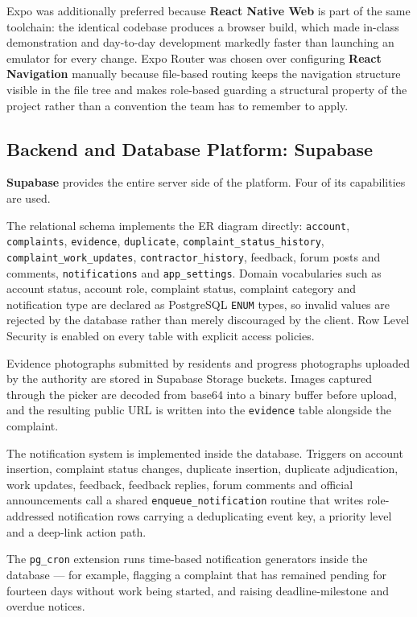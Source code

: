 \documentclass[11pt,a4paper]{article}
\newcommand{\code}[1]{\texttt{\small #1}}
\begin{document}
Expo was additionally preferred because \textbf{React Native Web} is part of the
same toolchain: the identical codebase produces a browser build, which made
in-class demonstration and day-to-day development markedly faster than launching
an emulator for every change. Expo Router was chosen over configuring
\textbf{React Navigation} manually because file-based routing keeps the
navigation structure visible in the file tree and makes role-based guarding a
structural property of the project rather than a convention the team has to
remember to apply.

\subsection{Backend and Database Platform: Supabase}

\textbf{Supabase} provides the entire server side of the platform. Four of its
capabilities are used.

\begin{description}[leftmargin=1.6em,style=nextline,itemsep=0.4em]
  \item[PostgreSQL database.] The relational schema implements the ER diagram
        directly: \code{account}, \code{complaints}, \code{evidence},
        \code{duplicate}, \code{complaint\_status\_history},
        \code{complaint\_work\_updates}, \code{contractor\_history}, feedback,
        forum posts and comments, \code{notifications} and \code{app\_settings}.
        Domain vocabularies such as account status, account role, complaint
        status, complaint category and notification type are declared as
        PostgreSQL \code{ENUM} types, so invalid values are rejected by the
        database rather than merely discouraged by the client. Row Level Security
        is enabled on every table with explicit access policies.
  \item[Storage.] Evidence photographs submitted by residents and progress
        photographs uploaded by the authority are stored in Supabase Storage
        buckets. Images captured through the picker are decoded from base64 into
        a binary buffer before upload, and the resulting public URL is written
        into the \code{evidence} table alongside the complaint.
  \item[PL/pgSQL functions and triggers.] The notification system is implemented
        inside the database. Triggers on account insertion, complaint status
        changes, duplicate insertion, duplicate adjudication, work updates,
        feedback, feedback replies, forum comments and official announcements
        call a shared \code{enqueue\_notification} routine that writes
        role-addressed notification rows carrying a deduplicating event key, a
        priority level and a deep-link action path.
  \item[Scheduled jobs.] The \code{pg\_cron} extension runs time-based
        notification generators inside the database --- for example, flagging a
        complaint that has remained pending for fourteen days without work being
        started, and raising deadline-milestone and overdue notices.
\end{description}
\end{document}
